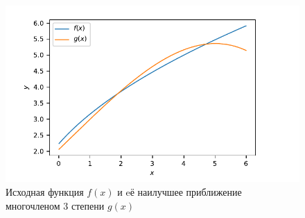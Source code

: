 \begin{figure}[h]
    \centering
    \includegraphics*[scale=1.0]{./figures/ex7.pdf}
    \caption{Исходная функция $f(x)$ и eё наилучшее приближение многочленом
    3 степени $g(x)$}
\end{figure}
